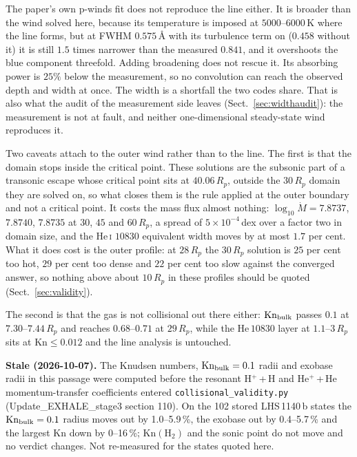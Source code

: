 \documentclass[english,a4paper]{my_memo}
\begin{document}
The paper's own p-winds fit does not reproduce the line either. It is broader
than the wind solved here, because its temperature is imposed at
$5000$--$6000$\,K where the line forms, but at FWHM $0.575$\,\AA{} with its
turbulence term on ($0.458$ without it) it is still $1.5$ times narrower than
the measured $0.841$, and it overshoots the blue component threefold. Adding
broadening does not rescue it. Its absorbing power is $25\%$ below the
measurement, so no convolution can reach the observed depth and width at
once. The width is a shortfall the two codes share. That is also what the
audit of the measurement side leaves (Sect.~\ref{sec:widthaudit}): the
measurement is not at fault, and neither one-dimensional steady-state wind
reproduces it.

\medskip
\noindent Two caveats attach to the outer wind rather than to the line. The
first is that the domain stops inside the critical point. These solutions are
the subsonic part of a transonic escape whose critical point sits at
$40.06\,R_p$, outside the $30\,R_p$ domain they are solved on, so what closes
them is the rule applied at the outer boundary and not a critical point. It
costs the mass flux almost nothing: $\log_{10}\dot M = 7.8737$, $7.8740$,
$7.8735$ at $30$, $45$ and $60\,R_p$, a spread of $5\times10^{-4}$\,dex over
a factor two in domain size, and the He\,\textsc{i} $10830$ equivalent width
moves by at most $1.7$ per cent. What it does cost is the outer profile: at
$28\,R_p$ the $30\,R_p$ solution is $25$ per cent too hot, $29$ per cent too
dense and $22$ per cent too slow against the converged answer, so nothing
above about $10\,R_p$ in these profiles should be quoted
(Sect.~\ref{sec:validity}).

The second is that the gas is not collisional out there either:
$\mathrm{Kn}_{\rm bulk}$ passes $0.1$ at $7.30$--$7.44\,R_p$ and reaches
$0.68$--$0.71$ at $29\,R_p$, while the He\,$10830$ layer at
$1.1$--$3\,R_p$ sits at $\mathrm{Kn} \le 0.012$ and the line analysis is
untouched.

\noindent\textbf{Stale (2026-10-07).} The Knudsen numbers, $\mathrm{Kn}_{\rm bulk}=0.1$ radii and exobase radii in this passage were computed before the resonant H$^+$\,+\,H and He$^+$\,+\,He momentum-transfer coefficients entered \texttt{collisional\_validity.py} (Update\_EXHALE\_stage3 section 110). On the 102 stored LHS\,1140\,b states the $\mathrm{Kn}_{\rm bulk}=0.1$ radius moves out by 1.0--5.9\,\%, the exobase out by 0.4--5.7\,\% and the largest Kn down by 0--16\,\%; $\mathrm{Kn}(\mathrm{H_2})$ and the sonic point do not move and no verdict changes. Not re-measured for the states quoted here.
\end{document}
